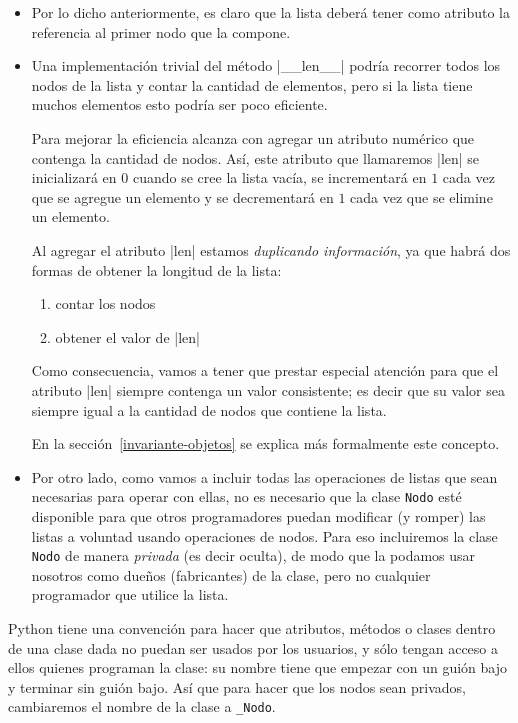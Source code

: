 \begin{itemize}

\item Por lo dicho anteriormente, es claro que la lista deberá tener como
atributo la referencia al primer nodo que la compone.

\item Una implementación trivial del método |__len__| podría
recorrer todos los nodos de la lista y contar la cantidad de elementos,
pero si la lista tiene muchos elementos esto podría ser poco eficiente.

Para mejorar la eficiencia alcanza con agregar un atributo numérico que
contenga la cantidad de nodos. Así, este atributo que llamaremos |len|
se inicializará en $0$ cuando se cree la lista vacía, se
incrementará en $1$ cada vez que se agregue un elemento y se decrementará en $1$
cada vez que se elimine un elemento.

\begin{atencion}
Al agregar el atributo |len| estamos \emph{duplicando información}, ya que habrá
dos formas de obtener la longitud de la lista:

\begin{enumerate}
\item contar los nodos
\item obtener el valor de |len|
\end{enumerate}

Como consecuencia, vamos a tener que prestar especial atención para que el
atributo |len| siempre contenga un valor consistente; es decir que su valor sea
siempre igual a la cantidad de nodos que contiene la lista.

En la sección~\ref{invariante-objetos} se explica más formalmente este
concepto.
\end{atencion}

\item Por otro lado, como vamos a incluir todas las operaciones de listas
que sean necesarias para operar con ellas, no es necesario que la clase
\lstinline!Nodo! esté disponible para que otros programadores puedan
modificar (y romper) las listas a voluntad usando operaciones de nodos. Para eso
incluiremos la clase \lstinline!Nodo! de manera \emph{privada} (es
decir oculta), de modo que la podamos usar nosotros como dueños
(fabricantes) de la clase, pero no cualquier programador que utilice la
lista.
\end{itemize}

Python tiene una convención para hacer que atributos, métodos o clases
dentro de una clase dada no puedan ser usados por los usuarios, y sólo
tengan acceso a ellos quienes programan la clase: su nombre tiene que
empezar con un guión bajo y terminar sin guión bajo. Así que para hacer que
los nodos sean privados, cambiaremos el nombre de la clase a \lstinline|_Nodo|.


